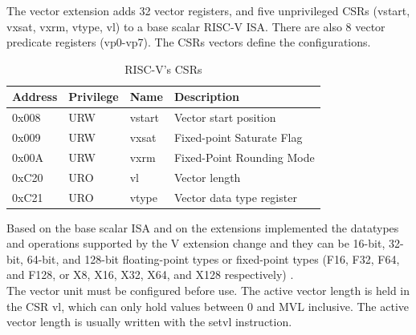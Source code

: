 The vector extension adds 32 vector registers, and five unprivileged CSRs (vstart, vxsat, vxrm, vtype, vl) to a base scalar RISC-V ISA\cite{riscv-v-specs}.
There are also 8 vector predicate registers (vp0-vp7). The CSRs vectors define the configurations.

\begin{table}[H]
    \centering
    \begin{tabular}{|l|l|l|l|}
        \hline
        Address & Privilege & Name   & Description               \\ \hline
        0x008   & URW       & vstart & Vector start position     \\ \hline
        0x009   & URW       & vxsat  & Fixed-point Saturate Flag \\ \hline
        0x00A   & URW       & vxrm   & Fixed-Point Rounding Mode \\ \hline
        0xC20   & URO       & vl     & Vector length             \\ \hline
        0xC21   & URO       & vtype  & Vector data type register \\ \hline
    \end{tabular}
    \caption{RISC-V's CSRs}
    \label{CSRs}
\end{table}

Based on the base scalar ISA and on the extensions implemented the datatypes and operations supported by the V extension change and they can be 16-bit, 32-bit, 64-bit, and 128-bit ﬂoating-point types or fixed-point types (F16, F32, F64, and F128, or X8, X16, X32, X64, and X128 respectively) \cite{riscv-v-specs}.\\


The vector unit must be conﬁgured before use. 
The active vector length is held in the CSR vl, which can only hold values between 0 and MVL inclusive.
The active vector length is usually written with the setvl instruction.\\

